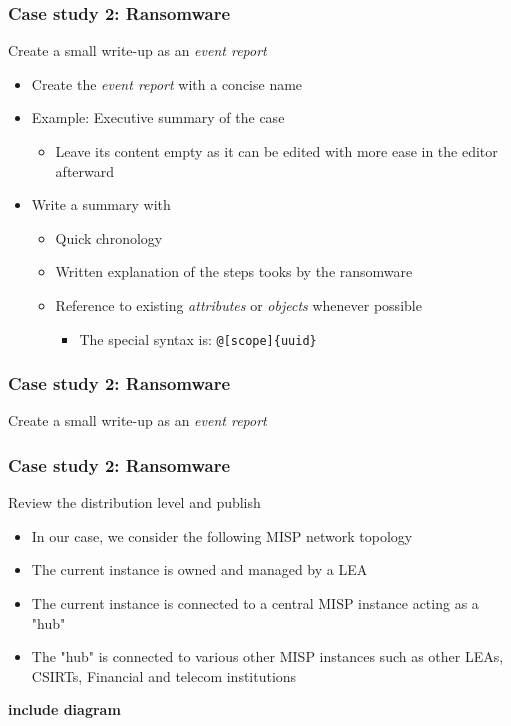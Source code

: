 \begin{frame}
    \frametitle{Case study 2: Ransomware}
    Create a small write-up as an \textit{event report}
    \begin{itemize}
        \item Create the \textit{event report} with a concise name
        \item Example: Executive summary of the case
        \begin{itemize}
            \item Leave its content empty as it can be edited with more ease in the editor afterward
        \end{itemize}
        \item Write a summary with
        \begin{itemize}
            \item Quick chronology
            \item Written explanation of the steps tooks by the ransomware
            \item Reference to existing \textit{attributes} or \textit{objects} whenever possible
            \begin{itemize}
                \item The special syntax is: \texttt{@[scope]\{uuid\}}
            \end{itemize}
        \end{itemize}
    \end{itemize}
\end{frame}

\begin{frame}
    \frametitle{Case study 2: Ransomware}
    Create a small write-up as an \textit{event report}
    \begin{center}
    \end{center}
\end{frame}

\begin{frame}
    \frametitle{Case study 2: Ransomware}
    Review the distribution level and publish
    \begin{itemize}
        \item In our case, we consider the following MISP network topology
        \item The current instance is owned and managed by a LEA
        \item The current instance is connected to a central MISP instance acting as a "hub"
        \item The "hub" is connected to various other MISP instances such as other LEAs, CSIRTs, Financial and telecom institutions
    \end{itemize}
    \textbf{include diagram}
\end{frame}

